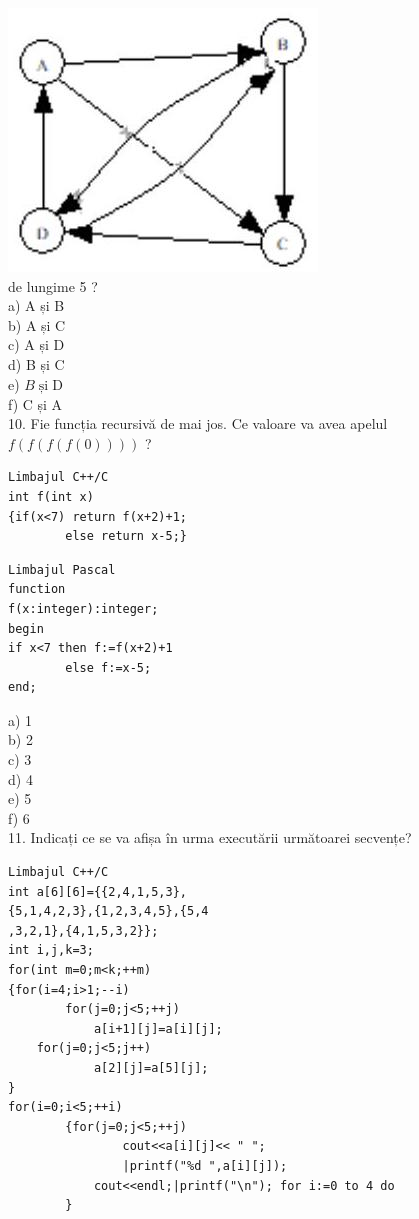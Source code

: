 \documentclass[10pt]{article}
\begin{document}
\includegraphics[max width=\textwidth, center]{2025_04_17_46e04c6acd873ea9558dg-231(8)}\\
de lungime 5 ?\\
a) A și B\\
b) A și C\\
c) A și D\\
d) B și C\\
e) $B \operatorname{și} \mathrm{D}$\\
f) C și A\\
10. Fie funcția recursivă de mai jos. Ce valoare va avea apelul $f(f(f(f(0))))$ ?

\begin{verbatim}
Limbajul C++/C
int f(int x)
{if(x<7) return f(x+2)+1;
        else return x-5;}
\end{verbatim}

\begin{verbatim}
Limbajul Pascal
function
f(x:integer):integer;
begin
if x<7 then f:=f(x+2)+1
        else f:=x-5;
end;
\end{verbatim}

a) 1\\
b) 2\\
c) 3\\
d) 4\\
e) 5\\
f) 6\\
11. Indicați ce se va afișa în urma executării următoarei secvențe?

\begin{verbatim}
Limbajul C++/C
int a[6][6]={{2,4,1,5,3},
{5,1,4,2,3},{1,2,3,4,5},{5,4
,3,2,1},{4,1,5,3,2}};
int i,j,k=3;
for(int m=0;m<k;++m)
{for(i=4;i>1;--i)
        for(j=0;j<5;++j)
            a[i+1][j]=a[i][j];
    for(j=0;j<5;j++)
            a[2][j]=a[5][j];
}
for(i=0;i<5;++i)
        {for(j=0;j<5;++j)
                cout<<a[i][j]<< " ";
                |printf("%d ",a[i][j]);
            cout<<endl;|printf("\n"); for i:=0 to 4 do
        }
\end{verbatim}
\end{document}
